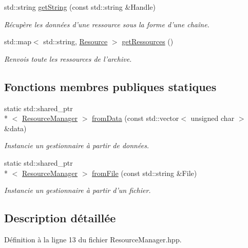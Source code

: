 \begin{DoxyCompactItemize}
std\+::string \hyperlink{classResourceManager_ae642fd96b5cf5e2a6ee19db107b9ae03}{get\+String} (const std\+::string \&Handle)
\begin{DoxyCompactList}\small\item\em Récupère les données d'une ressource sous la forme d'une chaîne. \end{DoxyCompactList}\item 
std\+::map$<$ std\+::string, \hyperlink{ResourceManager_8hpp_ac29d54814dbcb83b635aface304200ae}{Resource} $>$ \hyperlink{classResourceManager_aff0d8b5b68006034bd31d67e6aaea3fb}{get\+Ressources} ()
\begin{DoxyCompactList}\small\item\em Renvois toute les ressources de l'archive. \end{DoxyCompactList}\end{DoxyCompactItemize}
\subsection*{Fonctions membres publiques statiques}
\begin{DoxyCompactItemize}
\item 
static std\+::shared\+\_\+ptr\\*
$<$ \hyperlink{classResourceManager}{Resource\+Manager} $>$ \hyperlink{classResourceManager_a832206535b73564824f1102b5ed5844f}{from\+Data} (const std\+::vector$<$ unsigned char $>$ \&data)
\begin{DoxyCompactList}\small\item\em Instancie un gestionnaire à partir de données. \end{DoxyCompactList}\item 
static std\+::shared\+\_\+ptr\\*
$<$ \hyperlink{classResourceManager}{Resource\+Manager} $>$ \hyperlink{classResourceManager_a90b982650eab524ba9b45942732147d9}{from\+File} (const std\+::string \&File)
\begin{DoxyCompactList}\small\item\em Instancie un gestionnaire à partir d'un fichier. \end{DoxyCompactList}\end{DoxyCompactItemize}


\subsection{Description détaillée}


Définition à la ligne 13 du fichier Resource\+Manager.\+hpp.



